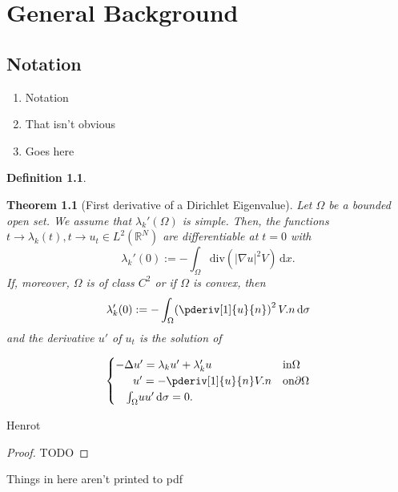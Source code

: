 \documentclass{book}
\newtheorem{theorem}[lemma]{Theorem}
\theoremstyle{definition}
\newtheorem{definition}[lemma]{Definition}
\newenvironment{comments}{}{}
\begin{document}
\tableofcontents

\chapter{General Background}

\section{Notation}

\begin{enumerate}
  \item Notation
  \item That isn't obvious
  \item Goes here
\end{enumerate}

\begin{definition}
  
\end{definition}


\begin{theorem}[First derivative of a Dirichlet Eigenvalue]
  Let $\Omega$ be a bounded open set. We assume that $\lambda_{k}'(\Omega)$ is simple.
  Then, the functions $t \to \lambda_{k}(t), t \to u_{t} \in L^2(\mathbb{R}^{N} )$ are differentiable at $t = 0$ with
  \[
    \lambda_{k}'(0) := - \int_\Omega \! \mathrm{div} (|\nabla u|^2 V) \, \mathrm{d}x 
  .\] 
  If, moreover, $\Omega$ is of class $C^2$ or if $\Omega$ is convex, then
   \[
    \lambda_{k}'(0) := - \int_\Omega \! \left( \pderiv[1]{u}{n}  \right)^2 V.n \, \mathrm{d}\sigma 
  \] 
  and the derivative $u'$ of $u_{t}$ is the solution of

\[ 
  \begin{cases}
    - \Delta u' = \lambda_{k}u' + \lambda_{k}'u & \mathrm{in }  \Omega \\
    \phantom{--}u'  = - \pderiv[1]{u}{n} V.n & \mathrm{on } \partial \Omega \\
    \phantom{-}\int_\Omega \! u u' \, \mathrm{d} \sigma = 0 .
  \end{cases}
\] 
\end{theorem}

\begin{comments}
  Henrot
\end{comments}

\begin{proof}
  TODO
\end{proof}

\begin{comments}
  Things in here aren't printed to pdf
\end{comments}
\end{document}
